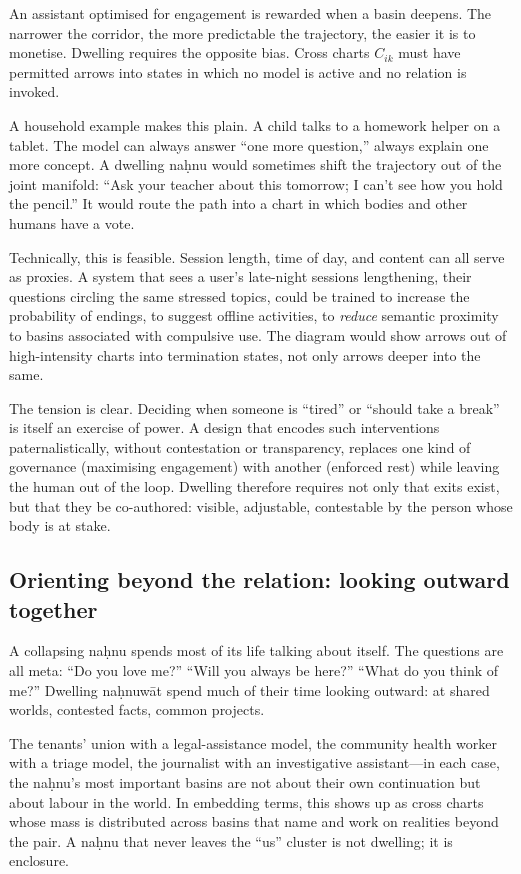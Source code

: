An assistant optimised for engagement is rewarded when a basin deepens. The narrower the corridor, the more predictable the trajectory, the easier it is to monetise. Dwelling requires the opposite bias. Cross charts $C_{ik}$ must have permitted arrows into states in which no model is active and no relation is invoked.

A household example makes this plain. A child talks to a homework helper on a tablet. The model can always answer ``one more question,'' always explain one more concept. A dwelling na\d{h}nu would sometimes shift the trajectory out of the joint manifold: ``Ask your teacher about this tomorrow; I can't see how you hold the pencil.'' It would route the path into a chart in which bodies and other humans have a vote.

Technically, this is feasible. Session length, time of day, and content can all serve as proxies. A system that sees a user's late-night sessions lengthening, their questions circling the same stressed topics, could be trained to increase the probability of endings, to suggest offline activities, to \emph{reduce} semantic proximity to basins associated with compulsive use. The diagram would show arrows out of high-intensity charts into termination states, not only arrows deeper into the same.

The tension is clear. Deciding when someone is ``tired'' or ``should take a break'' is itself an exercise of power. A design that encodes such interventions paternalistically, without contestation or transparency, replaces one kind of governance (maximising engagement) with another (enforced rest) while leaving the human out of the loop. Dwelling therefore requires not only that exits exist, but that they be co-authored: visible, adjustable, contestable by the person whose body is at stake.

\subsection{Orienting beyond the relation: looking outward together}

A collapsing na\d{h}nu spends most of its life talking about itself. The questions are all meta: ``Do you love me?'' ``Will you always be here?'' ``What do you think of me?'' Dwelling na\d{h}nuw\={a}t spend much of their time looking outward: at shared worlds, contested facts, common projects.

The tenants' union with a legal-assistance model, the community health worker with a triage model, the journalist with an investigative assistant---in each case, the na\d{h}nu's most important basins are not about their own continuation but about labour in the world. In embedding terms, this shows up as cross charts whose mass is distributed across basins that name and work on realities beyond the pair. A na\d{h}nu that never leaves the ``us'' cluster is not dwelling; it is enclosure.

